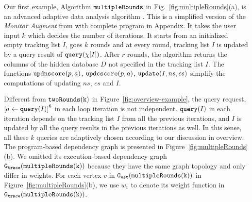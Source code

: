 \begin{example}
\label{ex:multipleRounds}
%
Our first example, Algorithm $\mathtt{multipleRounds}$ in Fig.~\ref{fig:multipleRounds}(a), is an advanced adaptive data analysis algorithm .
This is a simplified version of the \emph{Monitor Augment} from \cite{RogersRSSTW20} with complete program in Appendix.
It takes the user input $k$ which decides the 
number of iterations.
It starts from an initialized empty tracking list $I$,
goes $k$ rounds and at every round, tracking list $I$ is updated by a query result of ${\tt query}(\chi[I])$.
After $r$ rounds, the algorithm returns the columns of the hidden database $D$ not specified in the tracking list $I$.
The functions $\mathtt{updnscore}(p,a)$,
$\mathtt{updcscore}(p,a)$, $\mathtt{update}(I,ns,cs)$ simplify the computations of updating $ns$, $cs$ and $I$.%

    Different from $\mathtt{twoRounds(k)}$ in Figure~\ref{fig:overview-example},
the query request, $\clabel{\assign{a}{\query(I)}}^6$ in each loop iteration is not independent. 
${\tt query}(I)$ in each iteration depends on the tracking list $I$ from all the previous iterations, 
and $I$ is updated by all the query results in the previous iterations as well. 
In this sense, all these $k$ queries are adaptively chosen according to our discussion in overview.
The program-based dependency graph is presented in Figure~\ref{fig:multipleRounds}(b). 
We omitted its execution-based dependency graph $\mathtt{{G_{trace}}}(\mathtt{multipleRounds(k)})$ because they have the same graph topology and only differ in weights.
For each vertex $v$ in $\mathtt{{G_{est}}}(\mathtt{multipleRounds(k)})$ in Figure~\ref{fig:multipleRounds}(b),
we use $w_{v}$ to denote its weight function in $\mathtt{{G_{trace}}}(\mathtt{multipleRounds(k)})$.


\end{example}
